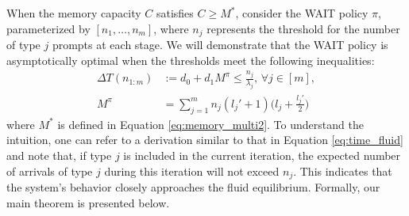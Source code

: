 \documentclass[opre,dblanonrev]{informs4}
\begin{document}
\maketitle


When the memory capacity $C$ satisfies \(C \geq M^*\), consider the WAIT policy \(\pi\), parameterized by \([n_1, \dots, n_m]\), where \(n_j\) represents the threshold for the number of type \(j\) prompts at each stage. We will demonstrate that the WAIT policy is asymptotically optimal when the thresholds meet the following inequalities:
\begin{equation}
\label{eq:wait_thresholds}
\begin{aligned}
\Delta T(n_{1:m}) &:= d_0 + d_1 M^{\pi} \leq \tfrac{n_j}{\lambda_j},\, \forall j\in[m],\\
 M^{\pi} &= \sum_{j=1}^m n_j (l_j' + 1) \big(l_j + \tfrac{l_j'}{2}\big)
\end{aligned}
\end{equation}
where \(M^*\) is defined in Equation \eqref{eq:memory_multi2}. To understand the intuition, one can refer to a derivation similar to that in Equation \eqref{eq:time_fluid} and note that, if type \(j\) is included in the current iteration, the expected number of arrivals of type \(j\) during this iteration will not exceed \(n_j\). This indicates that the system’s behavior closely approaches the fluid equilibrium. Formally, our main theorem is presented below.


\end{document}
